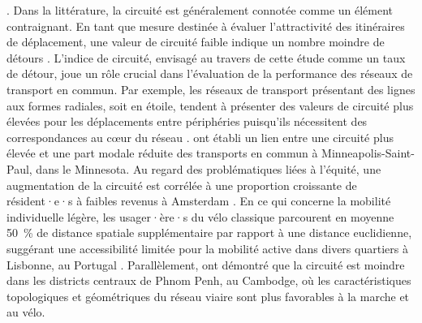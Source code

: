\begin{refsegment}
{}. Dans la littérature, la circuité est généralement connotée comme un élément contraignant. En tant que mesure destinée à évaluer l'attractivité des itinéraires de déplacement, une valeur de circuité faible indique un nombre moindre de détours \textcolor{blue}{\autocite[2]{costa_circuity_2021}}. L'indice de circuité, envisagé au travers de cette étude comme un taux de détour, joue un rôle crucial dans l'évaluation de la performance des réseaux de transport en commun. Par exemple, les réseaux de transport présentant des lignes aux formes radiales, soit en étoile, tendent à présenter des valeurs de circuité plus élevées pour les déplacements entre périphéries puisqu'ils nécessitent des correspondances au cœur du réseau \textcolor{blue}{\autocite[1]{dixit_examining_2021}}. \textcolor{blue}{\textcite[150]{huang_circuity_2015}} ont établi un lien entre une circuité plus élevée et une part modale réduite des transports en commun à Minneapolis-Saint-Paul, dans le Minnesota. Au regard des problématiques liées à l'équité, une augmentation de la circuité est corrélée à une proportion croissante de résident·e·s à faibles revenus à Amsterdam \textcolor{blue}{\autocite[7]{dixit_examining_2021}}. En ce qui concerne la mobilité individuelle légère, les usager·ère·s du vélo classique parcourent en moyenne 50~\% de distance spatiale supplémentaire par rapport à une distance euclidienne, suggérant une accessibilité limitée pour la mobilité active dans divers quartiers à Lisbonne, au Portugal \textcolor{blue}{\autocite[13]{costa_circuity_2021}}. Parallèlement, \textcolor{blue}{\textcite[179]{yen_how_2023}} ont démontré que la circuité est moindre dans les districts centraux de Phnom Penh, au Cambodge, où les caractéristiques topologiques et géométriques du réseau viaire sont plus favorables à la marche et au vélo.%


\end{refsegment}
